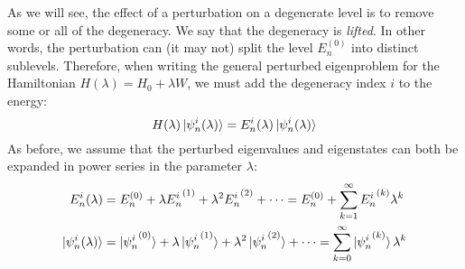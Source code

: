 As we will see, the effect of a perturbation on a degenerate level is to remove some or all of the degeneracy. We say that the degeneracy is \textit{lifted}. In other words, the perturbation can (it may not) split the level $E_n^{(0)}$ into distinct sublevels. Therefore, when writing the general perturbed eigenproblem for the Hamiltonian $H(\lambda) = H_0 + \lambda W$, we must add the degeneracy index $i$ to the energy:
\begin{equation}
    H(\lambda)\ket{{\psi_n^i}(\lambda)} = E_n^i(\lambda)\ket{{\psi_n^i}(\lambda)}
\end{equation}
As before, we assume that the perturbed eigenvalues and eigenstates can both be expanded in power series in the parameter $\lambda$:
\begin{equation}
    \begin{split}
        {E_n^i}(\lambda) &= E_n^{(0)} + \lambda {E_n^i}^{(1)} + \lambda^2 {E_n^i}^{(2)} + \cdots = E_n^{(0)} + \sum_{k=1}^\infty {E_n^i}^{(k)}\lambda^k\\
        \ket{{\psi_n^i}(\lambda)} &= \ket{{\psi_n^i}^{(0)}} + \lambda \ket{{\psi_n^i}^{(1)}} + \lambda^2\ket{{\psi_n^i}^{(2)}} + \cdots = \sum_{k=0}^\infty \ket{{\psi_n^i}^{(k)}}\lambda^k
    \end{split}
\end{equation}

